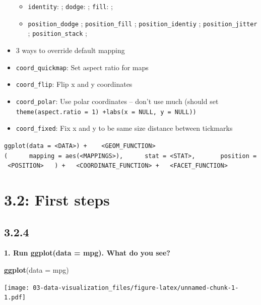 \documentclass[]{book}
\newenvironment{Shaded}{\begin{snugshade}}{\end{snugshade}}
\newcommand{\DataTypeTok}[1]{\textcolor[rgb]{0.13,0.29,0.53}{#1}}
\newcommand{\KeywordTok}[1]{\textcolor[rgb]{0.13,0.29,0.53}{\textbf{#1}}}
\newcommand{\NormalTok}[1]{#1}
\providecommand{\tightlist}{%
  \setlength{\itemsep}{0pt}\setlength{\parskip}{0pt}}
\theoremstyle{definition}
\theoremstyle{definition}
\theoremstyle{definition}
\theoremstyle{remark}
\begin{document}
\begin{itemize}
  \begin{itemize}
  \tightlist
  \item
    \texttt{identity}: ; \texttt{dodge}: ; \texttt{fill}: ;
  \item
    \texttt{position\_dodge} ; \texttt{position\_fill} ;
    \texttt{position\_identiy} ; \texttt{position\_jitter} ;
    \texttt{position\_stack} ;
  \end{itemize}
\item
  3 ways to override default mapping
\item
  \texttt{coord\_quickmap}: Set aspect ratio for maps
\item
  \texttt{coord\_flip}: Flip x and y coordinates
\item
  \texttt{coord\_polar}: Use polar coordinates -- don't use much (should
  set
  \texttt{theme(aspect.ratio\ =\ 1)\ +labs(x\ =\ NULL,\ y\ =\ NULL))}
\item
  \texttt{coord\_fixed}: Fix x and y to be same size distance between
  tickmarks
\end{itemize}

\texttt{ggplot(data\ =\ \textless{}DATA\textgreater{})\ +\ \ \ \ \textless{}GEOM\_FUNCTION\textgreater{}(\ \ \ \ \ \ mapping\ =\ aes(\textless{}MAPPINGS\textgreater{}),\ \ \ \ \ \ stat\ =\ \textless{}STAT\textgreater{},\ \ \ \ \ \ \ position\ =\ \textless{}POSITION\textgreater{}\ \ \ )\ +\ \ \ \textless{}COORDINATE\_FUNCTION\textgreater{}\ +\ \ \ \textless{}FACET\_FUNCTION\textgreater{}}

\hypertarget{first-steps}{%
\section{3.2: First steps}\label{first-steps}}

\hypertarget{section}{%
\subsection{3.2.4}\label{section}}

\textbf{1. Run ggplot(data = mpg). What do you see?}

\begin{Shaded}
\begin{Highlighting}[]
\KeywordTok{ggplot}\NormalTok{(}\DataTypeTok{data =}\NormalTok{ mpg)}
\end{Highlighting}
\end{Shaded}

\texttt{[image: 03-data-visualization\_files/figure-latex/unnamed-chunk-1-1.pdf]}
\end{document}
